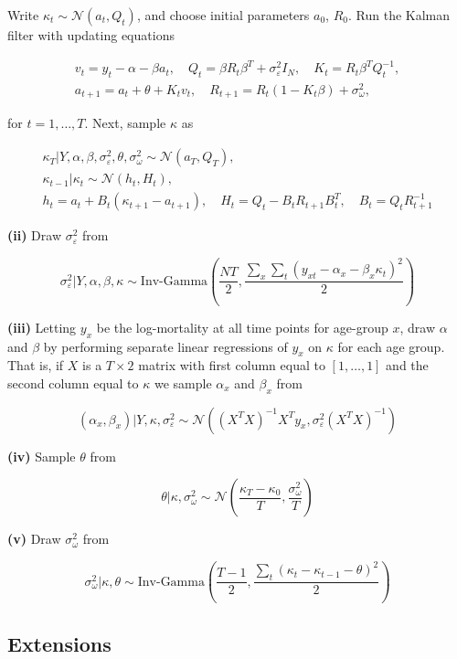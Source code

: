 \documentclass[
]{book}
\begin{document}
Write \(\kappa_t \sim \mathcal N(a_t, Q_t)\), and choose initial parameters \(a_0\), \(R_0\). Run the Kalman filter with updating equations

\[
\begin{gathered}
v_t = y_t - \alpha - \beta a_t, \quad Q_t = \beta R_t\beta^T + \sigma^2_\varepsilon I_N, \quad K_t = R_t\beta^TQ_t^{-1}, \\
a_{t+1} = a_t + \theta + K_tv_t, \quad R_{t+1} = R_t(1 - K_t\beta) + \sigma^2_\omega,
\end{gathered}
\]

for \(t = 1, \dots, T\). Next, sample \(\kappa\) as

\[
\begin{gathered}
\kappa_T | Y, \alpha, \beta, \sigma^2_\varepsilon, \theta, \sigma^2_\omega \sim \mathcal N(a_T, Q_T), \\
\kappa_{t-1} | \kappa_t \sim \mathcal N(h_t, H_t), \\
h_t = a_t + B_t(\kappa_{t+1} - a_{t+1}), \quad H_t = Q_t - B_tR_{t+1}B_t^T, \quad
B_t = Q_tR_{t+1}^{-1}
\end{gathered}
\]

\textbf{(ii)} Draw \(\sigma^2_\varepsilon\) from

\[
\sigma^2_\varepsilon | Y, \alpha, \beta, \kappa \sim \text{Inv-Gamma}\left(
\frac{NT}{2}, \frac{\sum_x\sum_t(y_{xt} - \alpha_x - \beta_x\kappa_t)^2}{2}
\right)
\]

\textbf{(iii)} Letting \(y_x\) be the log-mortality at all time points for age-group \(x\), draw \(\alpha\) and \(\beta\) by performing separate linear regressions of \(y_x\) on \(\kappa\) for each age group. That is, if \(X\) is a \(T \times 2\) matrix with first column equal to \([1, \dots, 1]\) and the second column equal to \(\kappa\) we sample \(\alpha_x\) and \(\beta_x\) from

\[
(\alpha_x, \beta_x) | Y, \kappa, \sigma^2_\varepsilon \sim \mathcal N(
(X^TX)^{-1}X^Ty_x, \sigma^2_\varepsilon (X^TX)^{-1}
)
\]

\textbf{(iv)} Sample \(\theta\) from

\[
\theta|\kappa, \sigma^2_\omega \sim \mathcal N\left(
\frac{\kappa_T - \kappa_0}{T}, \frac{\sigma^2_\omega}{T}
\right)
\]

\textbf{(v)} Draw \(\sigma^2_\omega\) from

\[
\sigma^2_\omega | \kappa, \theta \sim \text{Inv-Gamma}\left(
\frac{T - 1}{2}, \frac{\sum_t (\kappa_t - \kappa_{t-1} - \theta)^2}{2}
\right)
\]

\hypertarget{extensions}{%
\subsection{Extensions}\label{extensions}}
\end{document}
